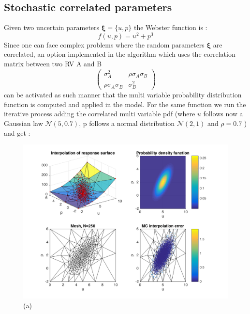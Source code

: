 \documentclass[11pt, a4paper, English]{report}
\begin{document}
\begin{appendix}
\section{Stochastic correlated parameters}
Given two uncertain parameters $\boldsymbol{\xi} = \{u, p\}$ the Webster function is :
$$ f(u,p) = u^2 + p^3$$
Since one can face complex problems where the random parameters $\boldsymbol{\xi}$ are correlated, an option implemented in the algorithm which uses the correlation matrix between two RV A and B
$$\begin{pmatrix} \sigma_A^2 & \rho\sigma_A\sigma_B \\ \rho\sigma_A\sigma_B & \sigma_B^2 \end{pmatrix}  $$
can be activated as such manner that the multi variable probability distribution function is computed and applied in the model. For the same function we run the iterative process adding the correlated multi variable pdf (where $u$ follows now a Gaussian law $\mathcal{N}(5,0.7)$, p follows a normal distribution $\mathcal{N}(2, 1)$ and $\rho = 0.7$ ) and get :
\begin{figure}[h!]
    \begin{minipage}[t]{0.5\textwidth}
        \centering
        \includegraphics[width=\textwidth]{Webster_cor1.png}
      (a)
    \end{minipage}
    \begin{minipage}[t]{0.5\textwidth}
        \centering

\end{minipage}
\end{figure}
\end{appendix}
\end{document}
